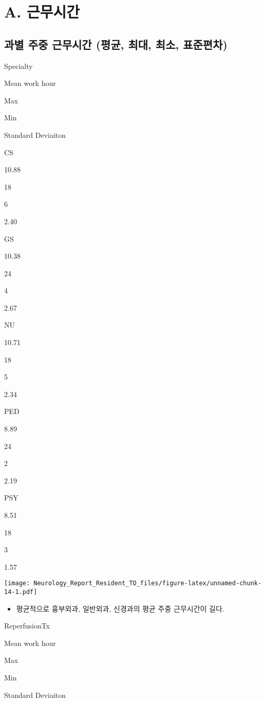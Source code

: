 \documentclass[]{book}
\providecommand{\tightlist}{%
  \setlength{\itemsep}{0pt}\setlength{\parskip}{0pt}}
\begin{document}
\hypertarget{a.-}{%
\section{A. 근무시간}\label{a.-}}

\hypertarget{section-17}{%
\subsection{과별 주중 근무시간 (평균, 최대, 최소, 표준편차)}\label{section-17}}

Specialty

Mean work hour

Max

Min

Standard Deviaiton

CS

10.88

18

6

2.40

GS

10.38

24

4

2.67

NU

10.71

18

5

2.34

PED

8.89

24

2

2.19

PSY

8.51

18

3

1.57

\texttt{[image: Neurology\_Report\_Resident\_TO\_files/figure-latex/unnamed-chunk-14-1.pdf]}

\begin{itemize}
\tightlist
\item
  평균적으로 흉부외과, 일반외과, 신경과의 평균 주중 근무시간이 길다.
\end{itemize}

ReperfusionTx

Mean work hour

Max

Min

Standard Deviaiton
\end{document}
